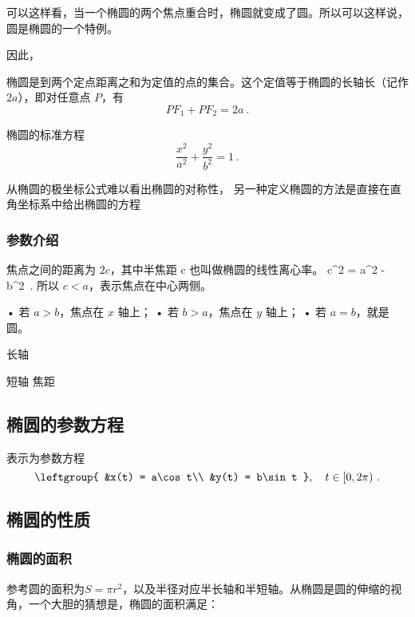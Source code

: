 {可以这样看，当一个椭圆的两个焦点重合时，椭圆就变成了圆。所以可以这样说，圆是椭圆的一个特例。

因此，

椭圆是到两个定点距离之和为定值的点的集合。这个定值等于椭圆的长轴长（记作 $2a$），即对任意点 $P$，有
\begin{equation}\label{eq_Elips3_9}
PF_1 + PF_2 = 2a ~.
\end{equation}

\begin{definition}{椭圆的标准方程}
\begin{equation}\label{eq_Elips3_3}
\frac{x^2}{a^2} + \frac{y^2}{b^2} = 1~.
\end{equation}
\end{definition}

从椭圆的极坐标公式难以看出椭圆的对称性， 另一种定义椭圆的方法是直接在直角坐标系中给出椭圆的方程

\subsubsection{参数介绍}


焦点之间的距离为 $2c$，其中半焦距 c 也叫做椭圆的线性离心率。
 c^2 = a^2 - b^2~. 
所以 $c < a$，表示焦点在中心两侧。

	•	若 $a > b$，焦点在 $x$ 轴上；
	•	若 $b > a$，焦点在 $y$ 轴上；
	•	若 $a = b$，就是圆。


长轴

短轴
焦距

\subsection{椭圆的参数方程}
表示为参数方程
\begin{equation}\label{eq_Elips3_1}
\leftgroup{
&x(t) = a\cos t\\
&y(t) = b\sin t
},\quad t \in [0, 2\pi) ~.
\end{equation}
\subsection{椭圆的性质}

\subsubsection{椭圆的面积}

参考圆的面积为$S = \pi r^2$，以及半径对应半长轴和半短轴。从椭圆是圆的伸缩的视角，一个大胆的猜想是，椭圆的面积满足：

}

